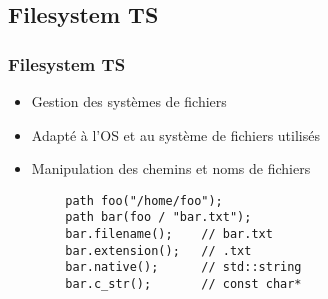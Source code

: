 \documentclass[C++.tex]{subfiles}
\begin{document}
\subsection*{Filesystem TS}
\begin{frame}[fragile]
	\frametitle{Filesystem TS}
	\begin{itemize}
		\item Gestion des systèmes de fichiers
		\item Adapté à l'OS et au système de fichiers utilisés
		\item Manipulation des chemins et noms de fichiers
	\end{itemize}

	\begin{verbatim}
		path foo("/home/foo");
		path bar(foo / "bar.txt");
		bar.filename();    // bar.txt
		bar.extension();   // .txt
		bar.native();      // std::string
		bar.c_str();       // const char*
	\end{verbatim}

\end{frame}
\end{document}

